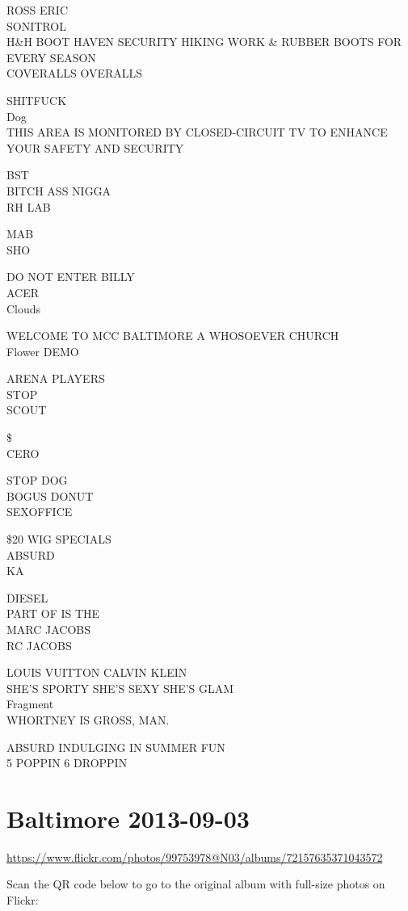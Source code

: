 \documentclass[10pt,letterpaper]{article}
\begin{document}
ROSS ERIC\\
SONITROL\\
H\&H BOOT HAVEN SECURITY HIKING WORK \& RUBBER BOOTS FOR EVERY SEASON\\
COVERALLS OVERALLS

SHITFUCK\\
Dog\\
THIS AREA IS MONITORED BY CLOSED{-}CIRCUIT TV TO ENHANCE YOUR SAFETY AND SECURITY

BST\\
BITCH ASS NIGGA\\
RH LAB

MAB\\
SHO

DO NOT ENTER BILLY\\
ACER\\
Clouds

WELCOME TO MCC BALTIMORE A WHOSOEVER CHURCH\\
Flower DEMO

ARENA PLAYERS\\
STOP\\
SCOUT

\$\\
CERO

STOP DOG\\
BOGUS DONUT\\
SEXOFFICE

\$20 WIG SPECIALS\\
ABSURD\\
KA

DIESEL\\
PART OF IS THE\\
MARC JACOBS\\
RC JACOBS

LOUIS VUITTON CALVIN KLEIN\\
SHE'S SPORTY SHE'S SEXY SHE'S GLAM\\
Fragment\\
WHORTNEY IS GROSS, MAN.

ABSURD INDULGING IN SUMMER FUN\\
5 POPPIN 6 DROPPIN


\section*{Baltimore 2013-09-03}

\url{https://www.flickr.com/photos/99753978@N03/albums/72157635371043572}

Scan the QR code below to go to the original album with full-size photos on Flickr:
\end{document}
